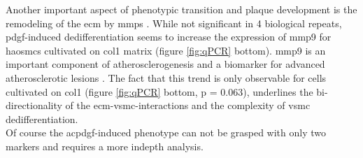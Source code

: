 Another important aspect of phenotypic transition and plaque development is the remodeling of the \ac{ecm} by \acp{mmp} \cite{johnsonMetalloproteinasesAtherosclerosis2017}. While not significant in 4 biological repeats, \ac{pdgf}-induced dedifferentiation seems to increase the expression of \ac{mmp9} for \acp{haosmc} cultivated on \ac{col1} matrix (figure \ref{fig:qPCR} bottom). \ac{mmp9} is an important component of atherosclerogenesis \cite{galisIncreasedExpressionMatrix1994} and a biomarker for advanced atherosclerotic lesions \cite{langleyExtracellularMatrixProteomics2017}. The fact that this trend is only observable for cells cultivated on \ac{col1} (figure \ref{fig:qPCR} bottom, p = 0.063), underlines the bi-directionality of the \ac{ecm}-\ac{vsmc}-interactions and the complexity of \ac{vsmc} dedifferentiation.\\
Of course the ac{pdgf}-induced phenotype can not be grasped with only two markers and requires a more indepth analysis.


